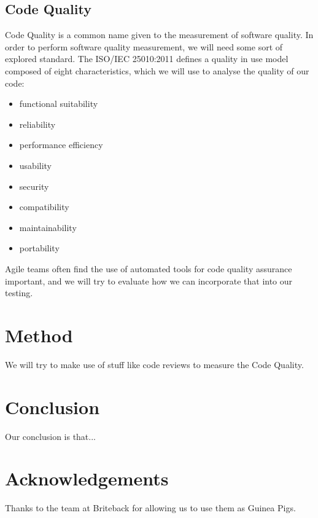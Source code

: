 \documentclass{sigchi}
\begin{document}
\subsection{Code Quality}
Code Quality is a common name given to the measurement of software quality.
In order to perform software quality measurement, we will need some sort of explored standard.
The ISO/IEC 25010:2011 defines a quality in use model composed of eight characteristics\cite{iso250102011},
which we will use to analyse the quality of our code:
\begin{itemize}
\setlength{\itemsep}{0.25em}
\item functional suitability
\item reliability
\item performance efficiency
\item usability
\item security
\item compatibility
\item maintainability
\item portability
\end{itemize}

Agile teams often find the use of automated tools for code quality assurance important\cite{Williams:2012:ATT:2133806.2133823}, and we will try to evaluate how we can incorporate that into our testing\cite{ala2005survey}.

\section{Method}

We will try to make use of stuff like code reviews to measure the Code Quality.

\section{Conclusion}

Our conclusion is that...

\section{Acknowledgements}

Thanks to the team at Briteback for allowing us to use them as Guinea Pigs.

%
%
%
%
%
\balance




\end{document}
